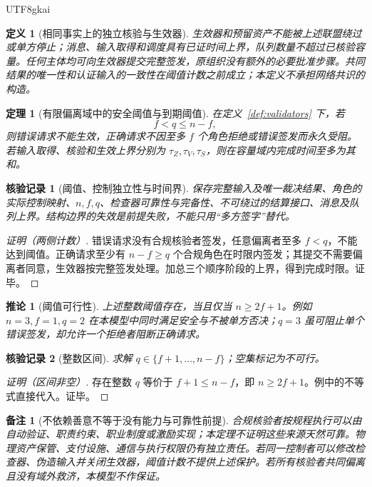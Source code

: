 \documentclass[12pt,a4paper,openany]{report}
\newtheorem{definition}{定义}[chapter]
\newtheorem{theorem}{定理}[chapter]
\newtheorem{corollary}{推论}[chapter]
\newtheorem{remark}{备注}[chapter]
\newtheorem{Certificate}{核验记录}[chapter]
\begin{document}
\begin{CJK*}{UTF8}{gkai}
\begin{definition}[相同事实上的独立核验与生效器]
生效器和预留资产不能被上述联盟绕过或单方停止；消息、输入取得和调度具有已证时间上界，队列数量不超过已核验容量。任何主体均可向生效器提交完整签发，原组织没有额外的必要批准步骤。共同结果的唯一性和认证输入的一致性在阈值计数之前成立；本定义不承担网络共识的构造。
\end{definition}

\begin{theorem}[有限偏离域中的安全阈值与到期阈值]
\label{thm:threshold}
在定义~\ref{def:validators} 下，若
\[
 \boxed{f<q\le n-f,}
\]
则错误请求不能生效，正确请求不因至多 $f$ 个角色拒绝或错误签发而永久受阻。若输入取得、核验和生效上界分别为 $\tau_Z,\tau_V,\tau_S$，则在容量域内完成时间至多为其和。
\end{theorem}
\begin{Certificate}[阈值、控制独立性与时间界]
保存完整输入及唯一裁决结果、角色的实际控制映射、$n,f,q$、检查器可靠性与完备性、不可绕过的结算接口、消息及队列上界。结构边界的失效是前提失败，不能只用“多方签字”替代。
\end{Certificate}
\begin{proof}[证明（两侧计数）]
错误请求没有合规核验者签发，任意偏离者至多 $f<q$，不能达到阈值。正确请求至少有 $n-f\ge q$ 个合规角色在时限内签发；其提交不需要偏离者同意，生效器按完整签发处理。加总三个顺序阶段的上界，得到完成时限。证毕。
\end{proof}

\begin{corollary}[阈值可行性]
\label{cor:threshold-feasible}
上述整数阈值存在，当且仅当 $n\ge2f+1$。例如 $n=3,f=1,q=2$ 在本模型中同时满足安全与不被单方否决；$q=3$ 虽可阻止单个错误签发，却允许一个拒绝者阻断正确请求。
\end{corollary}
\begin{Certificate}[整数区间]
求解 $q\in\{f+1,\ldots,n-f\}$；空集标记为不可行。
\end{Certificate}
\begin{proof}[证明（区间非空）]
存在整数 $q$ 等价于 $f+1\le n-f$，即 $n\ge2f+1$。例中的不等式直接代入。证毕。
\end{proof}

\begin{remark}[不依赖善意不等于没有能力与可靠性前提]
合规核验者按规程执行可以由自动验证、职责约束、职业制度或激励实现；本定理不证明这些来源天然可靠。物理资产保管、支付设施、通信与执行权限仍有独立责任。若同一控制者可以修改检查器、伪造输入并关闭生效器，阈值计数不提供上述保护。若所有核验者共同偏离且没有域外救济，本模型不作保证。
\end{remark}


\end{CJK*}
\end{document}
